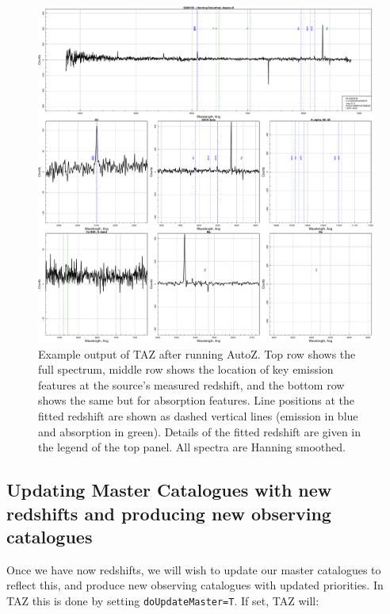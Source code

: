 \documentclass[12pt]{article}
\begin{document}
\begin{figure}
\begin{center}
\includegraphics[scale=0.4]{G006158.pdf}
\caption{Example output of TAZ after running AutoZ. Top row shows the full spectrum, middle row shows the location of key emission features at the source's measured redshift, and the bottom row shows the same but for absorption features. Line positions at the fitted redshift are shown as dashed vertical lines (emission in blue and absorption in green). Details of the fitted redshift are given in the legend of the top panel. All spectra are Hanning smoothed.}
\label{fig:specEx}
\end{center}
\end{figure}


 \subsection{Updating Master Catalogues with new redshifts and producing new observing catalogues}

Once we have now redshifts, we will wish to update our master catalogues to reflect this, and produce new observing catalogues with updated priorities. In TAZ this is done by setting \texttt{doUpdateMaster=T}. If set, TAZ will:\\
\end{document}
